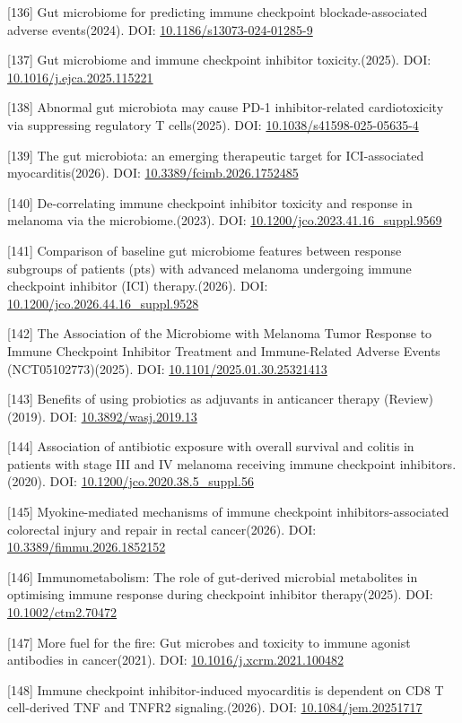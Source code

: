 {[}136{]} Gut microbiome for predicting immune checkpoint blockade-associated adverse events(2024). DOI: \url{10.1186/s13073-024-01285-9}

{[}137{]} Gut microbiome and immune checkpoint inhibitor toxicity.(2025). DOI: \url{10.1016/j.ejca.2025.115221}

{[}138{]} Abnormal gut microbiota may cause PD-1 inhibitor-related cardiotoxicity via suppressing regulatory T cells(2025). DOI: \url{10.1038/s41598-025-05635-4}

{[}139{]} The gut microbiota: an emerging therapeutic target for ICI-associated myocarditis(2026). DOI: \url{10.3389/fcimb.2026.1752485}

{[}140{]} De-correlating immune checkpoint inhibitor toxicity and response in melanoma via the microbiome.(2023). DOI: \url{10.1200/jco.2023.41.16_suppl.9569}

{[}141{]} Comparison of baseline gut microbiome features between response subgroups of patients (pts) with advanced melanoma undergoing immune checkpoint inhibitor (ICI) therapy.(2026). DOI: \url{10.1200/jco.2026.44.16_suppl.9528}

{[}142{]} The Association of the Microbiome with Melanoma Tumor Response to Immune Checkpoint Inhibitor Treatment and Immune-Related Adverse Events (NCT05102773)(2025). DOI: \url{10.1101/2025.01.30.25321413}

{[}143{]} Benefits of using probiotics as adjuvants in anticancer therapy (Review)(2019). DOI: \url{10.3892/wasj.2019.13}

{[}144{]} Association of antibiotic exposure with overall survival and colitis in patients with stage III and IV melanoma receiving immune checkpoint inhibitors.(2020). DOI: \url{10.1200/jco.2020.38.5_suppl.56}

{[}145{]} Myokine-mediated mechanisms of immune checkpoint inhibitors-associated colorectal injury and repair in rectal cancer(2026). DOI: \url{10.3389/fimmu.2026.1852152}

{[}146{]} Immunometabolism: The role of gut-derived microbial metabolites in optimising immune response during checkpoint inhibitor therapy(2025). DOI: \url{10.1002/ctm2.70472}

{[}147{]} More fuel for the fire: Gut microbes and toxicity to immune agonist antibodies in cancer(2021). DOI: \url{10.1016/j.xcrm.2021.100482}

{[}148{]} Immune checkpoint inhibitor-induced myocarditis is dependent on CD8 T cell-derived TNF and TNFR2 signaling.(2026). DOI: \url{10.1084/jem.20251717}

